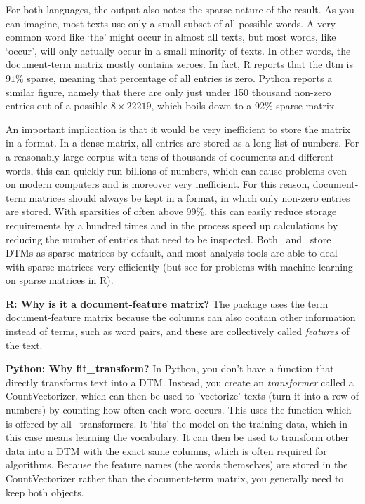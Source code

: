 For both languages, the output also notes the sparse nature of the result.
As you can imagine, most texts use only a small subset of all possible words.
A very common word like `the' might occur in almost all texts, but most words,
like `occur', will only actually occur in a small minority of texts.
In other words, the document-term matrix mostly contains zeroes.
In fact, R reports that the dtm is $91\%$ sparse, meaning that percentage of all entries is zero.
Python reports a similar figure, namely that there are only just under 150 thousand non-zero entries
out of a possible $8\times22219$, which boils down to a 92\% sparse matrix.

An important implication is that it would be very inefficient to store the matrix in a  format.
In a dense matrix, all entries are stored as a long list of numbers.
For a reasonably large corpus with tens of thousands of documents and different words, this can quickly run billions of numbers,
which can cause problems even on modern computers and is moreover very inefficient.
For this reason, document-term matrices should always be kept in a  format,
in which only non-zero entries are stored.
With sparsities of often above 99\%, this can easily reduce storage requirements by a hundred times and in the process speed up calculations by reducing the number of entries that need to be inspected.
Both \quanteda\ and \sklearn\ store DTMs as sparse matrices by default,
and most analysis tools are able to deal with sparse matrices very efficiently
(but see  for problems with machine learning on sparse matrices in R). 

\begin{feature}
  \textbf{R: Why is it a document-feature matrix?}
The package  uses the term document-feature matrix because the columns can also contain
other information instead of terms, such as word pairs, and these are collectively called \emph{features} of the text.
\end{feature}

\begin{feature}
\noindent\textbf{Python: Why fit\_transform?}
In Python, you don't have a function that directly transforms text into a DTM.
Instead, you create an \emph{transformer} called a CountVectorizer,
which can then be used to 'vectorize' texts (turn it into a row of numbers)
by counting how often each word occurs.
This uses the  function which is offered by all \sklearn\ transformers.
It `fits' the model on the training data, which in this case means learning the vocabulary.
It can then be used to transform other data into a DTM with the exact same columns,
which is often required for algorithms.
Because the feature names (the words themselves) are stored in the CountVectorizer
rather than the document-term matrix, you generally need to keep both objects.
\end{feature}

